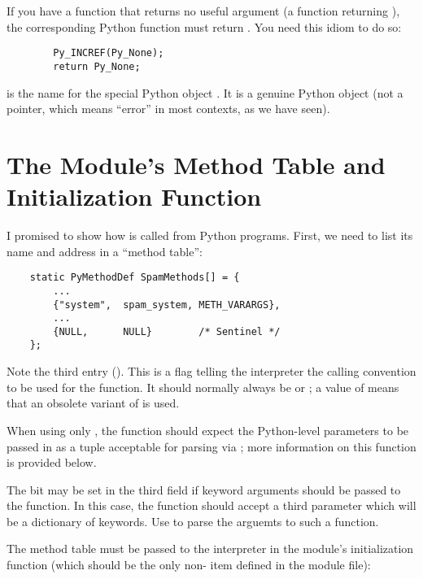 \documentclass[twoside,openright]{report}
\begin{document}
If you have a \C{} function that returns no useful argument (a function
returning ), the corresponding Python function must return
.   You need this idiom to do so:

\bcode\begin{verbatim}
        Py_INCREF(Py_None);
        return Py_None;
\end{verbatim}\ecode
%
 is the \C{} name for the special Python object
.  It is a genuine Python object (not a \NULL{}
pointer, which means ``error'' in most contexts, as we have seen).


\section{The Module's Method Table and Initialization Function}

I promised to show how  is called from Python
programs.  First, we need to list its name and address in a ``method
table'':

\bcode\begin{verbatim}
    static PyMethodDef SpamMethods[] = {
        ...
        {"system",  spam_system, METH_VARARGS},
        ...
        {NULL,      NULL}        /* Sentinel */
    };
\end{verbatim}\ecode
%
Note the third entry ().  This is a flag telling
the interpreter the calling convention to be used for the \C{}
function.  It should normally always be  or
; a value of  means that an
obsolete variant of  is used.

When using only , the function should expect
the Python-level parameters to be passed in as a tuple acceptable for
parsing via ; more information on this
function is provided below.

The  bit may be set in the third field if keyword
arguments should be passed to the function.  In this case, the \C{}
function should accept a third  parameter which will
be a dictionary of keywords.  Use  
to parse the arguemts to such a function.

The method table must be passed to the interpreter in the module's
initialization function (which should be the only non-
item defined in the module file):
\end{document}
